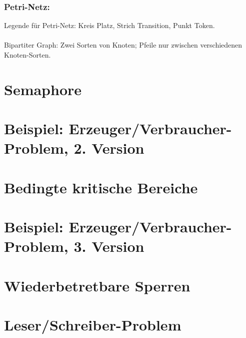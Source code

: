\subsubsection*{Petri-Netz:} %
Legende für Petri-Netz: Kreis Platz, Strich Transition, Punkt Token.\\
\\
Bipartiter Graph: Zwei Sorten von Knoten; Pfeile nur zwischen verschiedenen Knoten-Sorten.

\section{Semaphore}

\section[Beispiel: Erzeuger/Verbraucher (2)]{Beispiel: Erzeuger/Verbraucher-Problem, 2. Version}

\section{Bedingte kritische Bereiche}

\section[Beispiel: Erzeuger/Verbraucher (3)]{Beispiel: Erzeuger/Verbraucher-Problem, 3. Version}

\section{Wiederbetretbare Sperren}

\section{Leser/Schreiber-Problem}